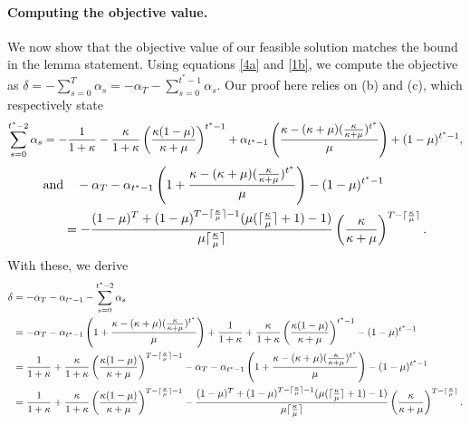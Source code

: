 \paragraph{Computing the objective value.}
    We now show that the objective value of our feasible solution  matches the bound in the lemma statement. Using equations \eqref{4a} and \eqref{1b}, we compute the objective as  $\delta = -\sum_{s=0}^{T} \alpha_s = -\alpha_T -\sum_{s=0}^{t^*-1} \alpha_s$. Our proof here relies on  (b) and (c), which respectively state
    \begin{align*}
            \sum_{s=0}^{t^*-2} \alpha_s = -\frac{1}{1 + \kappa} - \frac{\kappa}{1 + \kappa} \left( \frac{\kappa(1-\mu)}{\kappa +\mu} \right)^{t^* - 1} +  \alpha_{t^*-1} \left( \frac{\kappa - (\kappa + \mu)(\frac{\kappa}{\kappa + \mu})^{t^*}}{\mu} \right) + (1-\mu)^{t^*-1},
    \end{align*}
    \begin{align*}
        \text{and} &\quad -  \alpha_T - \alpha_{t^*-1} \left( 1 + \frac{\kappa - (\kappa + \mu)(\frac{\kappa}{\kappa + \mu})^{t^*}}{\mu} \right) - (1-\mu)^{t^*-1}\\ &= - \frac{(1-\mu)^T + (1-\mu)^{T - \lceil \frac{\kappa}{\mu}\rceil - 1} (\mu ( \lceil \frac{\kappa}{\mu} \rceil+1) -1)}{ \mu \lceil \frac{\kappa}{\mu}\rceil} \left(\frac{\kappa}{\kappa + \mu} \right)^{T - \lceil \frac{\kappa}{\mu}\rceil}.
    \end{align*}
    With these, we derive 
    \begin{align*}
        \delta &= - \alpha_T - \alpha_{t^*-1} - \sum_{s=0}^{t^*-2} \alpha_s \\
        &= - \alpha_T - \alpha_{t^*-1} \left( 1 + \frac{\kappa - (\kappa + \mu)(\frac{\kappa}{\kappa + \mu})^{t^*}}{\mu} \right) +\frac{1}{1 + \kappa} + \frac{\kappa}{1 + \kappa} \left( \frac{\kappa(1-\mu)}{\kappa +\mu} \right)^{t^* - 1} - (1-\mu)^{t^*-1}\\
        &= \frac{1}{1 + \kappa} + \frac{\kappa}{1 + \kappa} \left( \frac{\kappa(1-\mu)}{\kappa +\mu} \right)^{T - \lceil \frac{\kappa}{\mu}\rceil - 1} -  \alpha_T - \alpha_{t^*-1} \left( 1 + \frac{\kappa - (\kappa + \mu)(\frac{\kappa}{\kappa + \mu})^{t^*}}{\mu}  \right) - (1-\mu)^{t^*-1}\\
        &= \frac{1}{1 + \kappa} + \frac{\kappa}{1 + \kappa} \left( \frac{\kappa(1-\mu)}{\kappa +\mu} \right)^{T - \lceil \frac{\kappa}{\mu}\rceil - 1} - \frac{(1-\mu)^T + (1-\mu)^{T - \lceil \frac{\kappa}{\mu}\rceil - 1} (\mu ( \lceil \frac{\kappa}{\mu} \rceil+1) -1)}{ \mu \lceil \frac{\kappa}{\mu}\rceil} \left(\frac{\kappa}{\kappa + \mu} \right)^{T - \lceil \frac{\kappa}{\mu}\rceil}.
    \end{align*}

